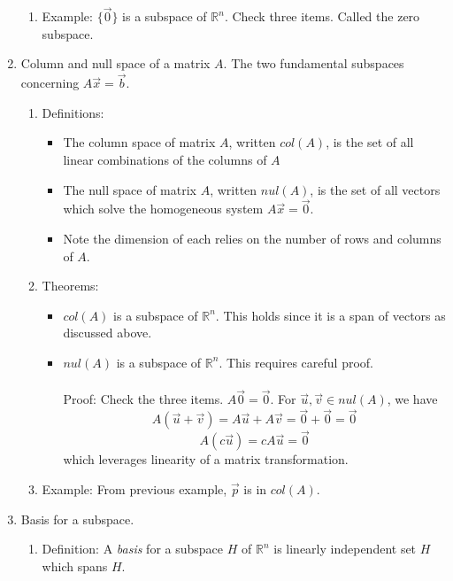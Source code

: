 \documentclass{article}
\begin{document}
\begin{enumerate}
\begin{enumerate}
\item Example: $\{\vec{0}\}$ is a subspace of $\mathbb{R}^n$. Check three items. Called the zero subspace.

\end{enumerate}

\item Column and null space of a matrix $A$. The two fundamental subspaces concerning $A\vec{x} = \vec{b}$.
\begin{enumerate}

\item Definitions:
\begin{itemize}
\item The column space of matrix $A$, written $col(A)$, is the set of all linear combinations of the columns of $A$
\item The null space of matrix $A$, written $nul(A)$, is the set of all vectors which solve the homogeneous system $A\vec{x}=\vec{0}$.
\item Note the dimension of each relies on the number of rows and columns of $A$.
\end{itemize}

\item Theorems:
\begin{itemize}
\item $col(A)$ is a subspace of $\mathbb{R}^n$. This holds since it is a span of vectors as discussed above.
\item $nul(A)$ is a subspace of $\mathbb{R}^n$. This requires careful proof. \\ \ \\
Proof: Check the three items. $A \vec{0}=\vec{0}$. For $\vec{u}, \vec{v} \in nul(A)$, we have 
\[
A(\vec{u}+\vec{v}) = A\vec{u}+A\vec{v} = \vec{0}+\vec{0}=\vec{0}
\]
\[
A(c\vec{u}) = cA\vec{u}=\vec{0}
\]
which leverages linearity of a matrix transformation.
\end{itemize}

\item Example: From previous example, $\vec{p}$ is in $col(A)$. 

\end{enumerate}

\item Basis for a subspace.

\begin{enumerate}
\item Definition: A \emph{basis} for a subspace $H$ of $\mathbb{R}^n$ is linearly independent set $H$ which spans $H$.


\end{enumerate}
\end{enumerate}
\end{document}
